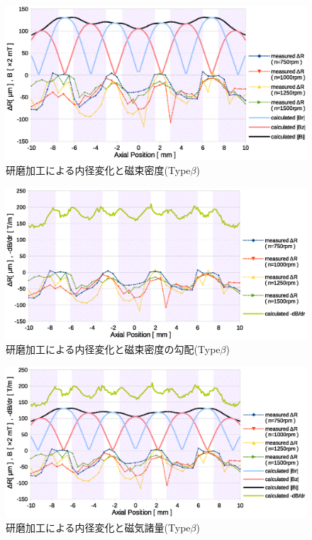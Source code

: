\documentclass[11pt]{jarticle}
\begin{document}
  \begin{figure}[H]
    \begin{center}
      \includegraphics[width=150mm]{Typebeta_B.eps}
    \end{center}
    \caption{研磨加工による内径変化と磁束密度(Type$\beta$)}
    \label{fig:Typebeta_B}
  \end{figure}

  \begin{figure}[H]
    \begin{center}
      \includegraphics[width=150mm]{Typebeta_dB.eps}
    \end{center}
    \caption{研磨加工による内径変化と磁束密度の勾配(Type$\beta$)}
    \label{fig:Typebeta_dB}
  \end{figure}

  \begin{figure}[H]
    \begin{center}
      \includegraphics[width=150mm]{Typebeta.eps}
    \end{center}
    \caption{研磨加工による内径変化と磁気諸量(Type$\beta$)}
    \label{fig:Typebeta}
  \end{figure}
\end{document}
